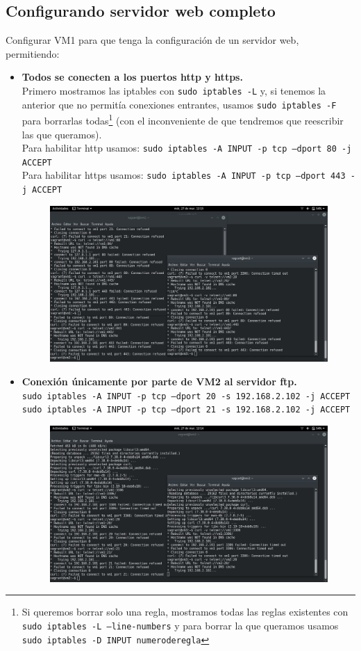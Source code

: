 \documentclass[12pt,letterpaper]{article}
\begin{document}
\subsection{Configurando servidor web completo}
Configurar VM1 para que tenga la configuración de un servidor web, permitiendo:
\begin{itemize}
	\item \textbf{Todos se conecten a los puertos http y https.} \\
	Primero mostramos las iptables con \texttt{sudo iptables -L} y, si tenemos la anterior que no permitía conexiones entrantes, usamos \texttt{sudo iptables -F} para borrarlas todas\footnote{Si queremos borrar solo una regla, mostramos todas las reglas existentes con \texttt{sudo iptables -L --line-numbers} y para borrar la que queramos usamos \texttt{sudo iptables -D INPUT numeroderegla}} (con el inconveniente de que tendremos que reescribir las que queramos).\\
	Para habilitar http usamos: \texttt{sudo iptables -A INPUT -p tcp ---dport 80 -j ACCEPT} \\
	Para habilitar https usamos: \texttt{sudo iptables -A INPUT -p tcp ---dport 443 -j ACCEPT}
	\begin{figure}[h]
		\centering
		\includegraphics[scale=0.34]{http.png}
	\end{figure}
	\item \textbf{Conexión únicamente por parte de VM2 al servidor ftp.} \\
	\texttt{sudo iptables -A INPUT -p tcp ---dport 20 -s 192.168.2.102 -j ACCEPT}\\
	\texttt{sudo iptables -A INPUT -p tcp ---dport 21 -s 192.168.2.102 -j ACCEPT}
	\begin{figure}[h]
		\centering
		\includegraphics[scale=0.34]{ftp.png}

\end{figure}
\end{itemize}
\end{document}
